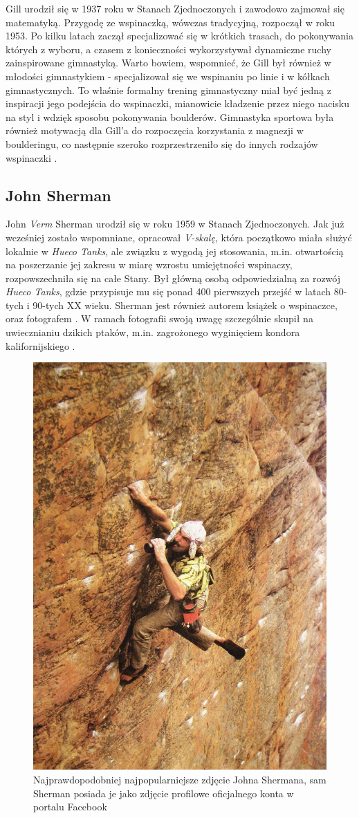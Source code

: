 \documentclass{article}
\begin{document}
Gill urodził się w 1937 roku w Stanach Zjednoczonych i zawodowo zajmował się matematyką. Przygodę ze wspinaczką, wówczas tradycyjną, rozpoczął w roku 1953. Po kilku latach zaczął specjalizować się w krótkich trasach, do pokonywania których z wyboru, a czasem z konieczności wykorzystywał dynamiczne ruchy zainspirowane gimnastyką. Warto bowiem, wspomnieć, że Gill był również w młodości gimnastykiem - specjalizował się we wspinaniu po linie i w kółkach gimnastycznych. To właśnie formalny trening gimnastyczny miał być jedną z inspiracji jego podejścia do wspinaczki, mianowicie kładzenie przez niego nacisku na styl i wdzięk sposobu pokonywania boulderów. Gimnastyka sportowa była również motywacją dla Gill'a do rozpoczęcia korzystania z magnezji w boulderingu, co następnie szeroko rozprzestrzeniło się do innych rodzajów wspinaczki \cite{gill-wiki}.

\subsection{John Sherman}
\label{js}
John \textit{Verm} Sherman urodził się w roku 1959 w Stanach Zjednoczonych. Jak już wcześniej zostało wspomniane, opracował \textit{V-skalę}, która początkowo miała służyć lokalnie w \textit{Hueco Tanks}, ale związku z wygodą jej stosowania, m.in. otwartością na poszerzanie jej zakresu w miarę wzrostu umiejętności wspinaczy, rozpowszechniła się na całe Stany. Był główną osobą odpowiedzialną za rozwój \textit{Hueco Tanks}, gdzie przypisuje mu się ponad 400 pierwszych przejść w latach 80-tych i 90-tych XX wieku. Sherman jest również autorem książek o wspinaczce, oraz fotografem \cite{verm-wiki}. W ramach fotografii swoją uwagę szczególnie skupił na uwiecznianiu dzikich ptaków, m.in. zagrożonego wyginięciem kondora kalifornijskiego \cite{vimeo-verm}. 

\begin{figure}[!htbp]
	\begin{center}
		\includegraphics[width=0.5\linewidth]{images/john-sherman.eps}
	\end{center}
	\caption{Najprawdopodobniej najpopularniejsze zdjęcie Johna Shermana, sam Sherman posiada je jako zdjęcie profilowe oficjalnego konta w portalu Facebook \cite{js-photo}}
\end{figure}
\end{document}
